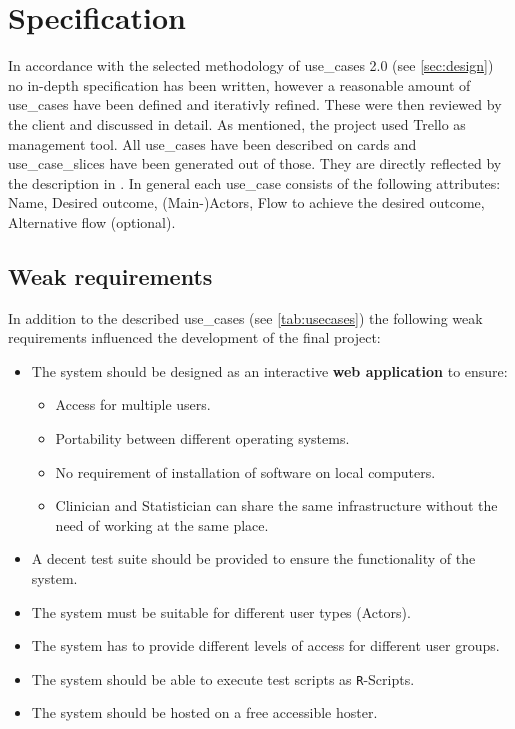 \section{Specification}
\label{sec:specification}

In accordance with the selected methodology of \glspl{use_case} 2.0 (see \autoref{sec:design}) no in-depth specification has been written, however a reasonable amount of \glspl{use_case} have been defined and iterativly refined. These were then reviewed by the client and discussed in detail. As mentioned, the project used Trello as management tool. All \glspl{use_case} have been described on cards and \glspl{use_case_slice} have been generated out of those. They are directly reflected by the description in \cite{sassoon2014,sassoon2016, sassoon2016CD}. In general each \gls{use_case} consists of the following attributes: Name, Desired outcome, (Main-)\glspl{Actor}, Flow to achieve the desired outcome, Alternative flow (optional).


\subsection{Weak requirements}
In addition to the described \glspl{use_case} (see \autoref{tab:usecases}) the following weak requirements influenced the development of the final project:

\begin{itemize}
	\item The system should be designed as an interactive \textbf{web application} to ensure:
	\begin{itemize}
		\item Access for multiple users.
		\item Portability between different operating systems.
		\item No requirement of installation of software on local computers.
		\item Clinician and Statistician can share the same infrastructure without the need of working at the same place.
	\end{itemize}
	\item A decent test suite should be provided to ensure the functionality of the system.
	\item The system must be suitable for different user types (\glspl{Actor}).
	\item The system has to provide different levels of access for different user groups.
	\item The system should be able to execute test scripts as \texttt{R}-Scripts.
	\item The system should be hosted on a free accessible hoster.
\end{itemize}

